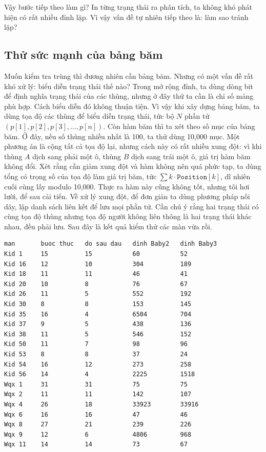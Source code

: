 \documentclass[11pt]{article}
\begin{document}
Vậy bước tiếp theo làm gì? In từng trạng thái ra phân tích, ta không khó phát
hiện có rất nhiều đỉnh lặp. Vì vậy vấn đề tự nhiên tiếp theo là: làm sao
tránh lặp?

\subsection{Thử sức mạnh của bảng băm}

Muốn kiểm tra trùng thì đương nhiên cần bảng băm. Nhưng có một vấn đề rất
khó xử lý: biểu diễn trạng thái thế nào? Trong mở rộng đỉnh, ta dùng dòng bit
để định nghĩa trạng thái của các thùng, nhưng ở đây thứ ta cần là chỉ số mảng
phù hợp. Cách biểu diễn đó không thuận tiện. Vì vậy khi xây dựng bảng băm, ta
dùng tọa độ các thùng để biểu diễn trạng thái, tức bộ \(N\) phần tử
\((p[1],p[2],p[3],\ldots,p[n])\). Còn hàm băm thì ta xét theo số mục của bảng
băm. Ở đây, nếu số thùng nhiều nhất là 100, ta thử dùng 10,000 mục. Một
phương án là cộng tất cả tọa độ lại, nhưng cách này có rất nhiều xung đột:
vì khi thùng \(A\) dịch sang phải một ô, thùng \(B\) dịch sang trái một ô,
giá trị hàm băm không đổi. Xét rằng cần giảm xung đột và hàm không nên quá
phức tạp, ta dùng tổng có trọng số của tọa độ làm giá trị băm, tức
\(\sum k\cdot\texttt{Position}[k]\), dĩ nhiên cuối cùng lấy modulo 10,000.
Thực ra hàm này cũng không tốt, nhưng tôi hơi lười, để sau cải tiến. Về xử
lý xung đột, để đơn giản ta dùng phương pháp nối dây, lập danh sách liên kết
để lưu mọi phần tử. Cần chú ý rằng hai trạng thái có cùng tọa độ thùng nhưng
tọa độ người không liên thông là hai trạng thái khác nhau, đều phải lưu. Sau
đây là kết quả kiểm thử các màn vừa rồi.

\begin{verbatim}
man       buoc thuc   do sau dau   dinh Baby2   dinh Baby3
Kid 1     15          15           60           52
Kid 16    12          10           304          189
Kid 18    11          11           46           41
Kid 20    10          8            76           67
Kid 26    11          5            552          192
Kid 30    8           8            153          145
Kid 35    16          4            6504         704
Kid 37    9           5            438          136
Kid 38    11          5            546          152
Kid 50    11          7            98           96
Kid 53    8           8            37           24
Kid 54    16          12           273          258
Kid 56    14          4            2225         1518
Wqx 1     31          31           75           75
Wqx 2     11          11           142          107
Wqx 4     26          18           33923        33916
Wqx 6     16          16           47           46
Wqx 8     27          21           239          226
Wqx 9     12          6            4806         968
Wqx 11    14          14           73           67
\end{verbatim}
\end{document}
